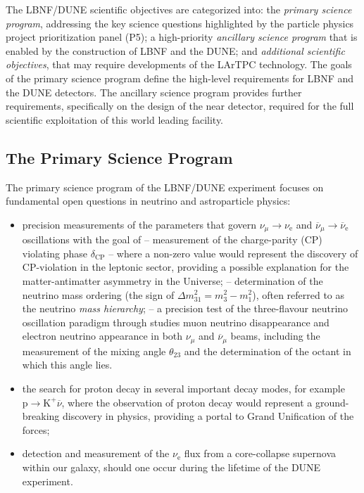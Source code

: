 The LBNF/DUNE scientific objectives are categorized into: the {\it primary science program}, addressing the key science questions highlighted by the particle physics project prioritization panel (P5); 
a high-priority {\it ancillary science program} that is 
enabled by the construction of LBNF and the DUNE; and {\it additional scientific objectives}, that may require developments 
of the LArTPC technology. The goals of the primary science program define the high-level requirements for LBNF and the 
DUNE detectors. The ancillary science program provides further requirements, specifically on the design of the near 
detector, required for the full scientific exploitation of this world leading facility.

\subsection{The Primary Science Program}

The primary science program of the LBNF/DUNE experiment focuses on fundamental open questions in neutrino and astroparticle physics: 
\begin{itemize}
  \item precision measurements of the parameters that govern $\nu_{\mu} \rightarrow \nu_\text{e}$ and
           $\overline{\nu}_{\mu} \rightarrow \overline{\nu}_\text{e}$ oscillations with the goal of
  \subitem -- measurement of the charge-parity (CP) violating phase $\delta_\text{CP}$ -- where a non-zero value would represent the discovery of CP-violation in the leptonic sector, providing a possible explanation for the matter-antimatter asymmetry in the Universe;
  \subitem -- determination of the neutrino mass ordering (the sign of $\Delta m^2_{31} = m_3^2-m_1^2$), often referred to as the neutrino {\it mass hierarchy};  
  \subitem -- a precision test of the three-flavour neutrino oscillation paradigm through studies muon neutrino disappearance 
    and electron neutrino appearance in both $\nu_\mu$ and $\overline{\nu}_{\mu}$ beams, including the 
    measurement of the mixing angle $\theta_{23}$ and the determination of the octant in which this angle lies.
    \item the search for proton decay in several important decay modes, for example $\text{p}\rightarrow\text{K}^+\overline{\nu}$, where the observation of proton decay would represent a ground-breaking discovery in physics, providing a portal to Grand Unification of the forces;
    \item detection and measurement of the $\nu_\text{e}$ flux from a core-collapse supernova within our galaxy, should one occur during the lifetime of the DUNE experiment.
\end{itemize}

